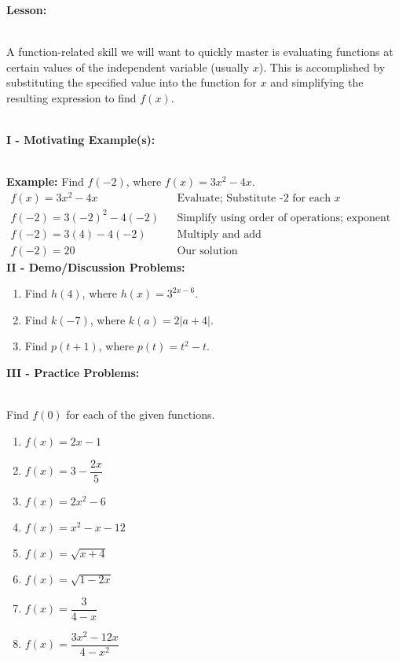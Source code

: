 \documentclass[12pt]{article}
\theoremstyle{definition}
\begin{document}
{\bf Lesson:}\\
\ \par
A function-related skill we will want to quickly master is evaluating functions at certain values of the independent variable (usually $x$).  This is accomplished by substituting the specified value into the function for $x$ and simplifying the resulting expression to find $f(x)$.\\
\ \par
{\bf I - Motivating Example(s):}\\
\ \par
{\bf Example:} Find $f(-2)$, where $f(x)=3x^2-4x$.
  \begin{eqnarray*}
    f (x) = 3 x^2 - 4 x &  & \text{Evaluate; Substitute -2 for each~} x\\
    f (- 2) = 3 (- 2)^2 - 4 (- 2) &  & \text{Simplify using order of operations; exponent first}\\
    f (- 2) = 3 (4) - 4 (- 2) &  & \text{Multiply and add}\\
    f (- 2) = 20 &  & \text{Our solution}
  \end{eqnarray*}
{\bf II - Demo/Discussion Problems:}
\begin{enumerate}
	\item Find $h(4)$, where $h(x)=3^{2 x - 6}$.
  \item Find $k(-7)$, where $k (a) = 2 |a + 4|$.
  \item Find $p(t+1)$, where $p(t)=t^2-t$.
\end{enumerate}
{\bf III - Practice Problems:}\\
\ \par
Find $f(0)$ for each of the given functions.
\begin{center}
\begin{multicols}{3}
\begin{enumerate}
\item $f(x) = 2x - 1$
\item $f(x) = 3 - \dfrac{2x}{5}$
\item $f(x) = 2x^2 - 6$
\item $f(x) = x^2 - x - 12$
\item $f(x) = \sqrt{x+4}$
\item $f(x) = \sqrt{1-2x}$
\item $f(x) = \dfrac{3}{4-x}$
\item $f(x) = \dfrac{3x^2-12x}{4-x^2}$
\end{enumerate}
\end{multicols}
\end{center}
\end{document}
